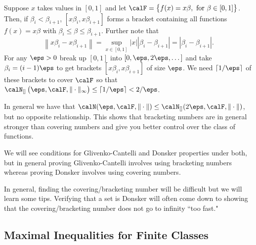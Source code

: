 \begin{example}
	\label{ex:brackering}
	Suppose \(x\) takes values in  \([0,1]\) and let \(\calF = \left\{f(x)=x\beta,\text{ for }\beta \in [0,1]\right\}\). Then, if \(\beta_i < \beta_{i+1}\),  \([x\beta_i, x\beta_{i+1}]\) forms a bracket containing all functions  \(f(x)=x\beta\) with  \(\beta_i \leq \beta\leq \beta_{i+1}\). Further note that \[
		\left\|x\beta_i - x\beta_{i+1}\right\| = \sup_{x\in[0,1]}|x||\beta_i-\beta_{i+1}| = |\beta_i -\beta_{i+1}|
	.\] 
	For any \(\eps>0\) break up  \([0,1]\) into  \([0,\eps,2\eps,\dots]\) and take \(\beta_i = (i-1)\eps\) to get brackets  \([x\beta_i,x\beta_{i+1}]\) of size \(\eps\). We need  \(\lceil 1/\eps\rceil\) of these brackets to cover  \(\calF\) so that  \(\calN_{[]}\left(\eps,\calF,\|\cdot\|_\infty\right)\leq \lceil 1/\eps\rceil < 2/\eps\).
\end{example}

\begin{remark*}
    \label{rem:bracketing-covering}
	In general we have that \(\calN(\eps,\calF,\|\cdot\|)\leq \calN_{[]}(2\eps,\calF,\|\cdot\|)\), but no opposite relationship. This shows that bracketing numbers are in general stronger than covering numbers and give you better control over the class of functions. 

	We will see conditions for Glivenko-Cantelli and Donsker properties under both, but in general proving Glivenko-Cantelli involves using bracketing numbers whereas proving Donsker involves using covering numbers.
\end{remark*}


In general, finding the covering/bracketing number will be difficult but we will learn some tips. Verifying that a set is Donsker will often come down to showing that the covering/bracketing number does not go to infinity ``too fast." 

\subsection{Maximal Inequalities for Finite Classes}%
\label{subsec:maximal}

